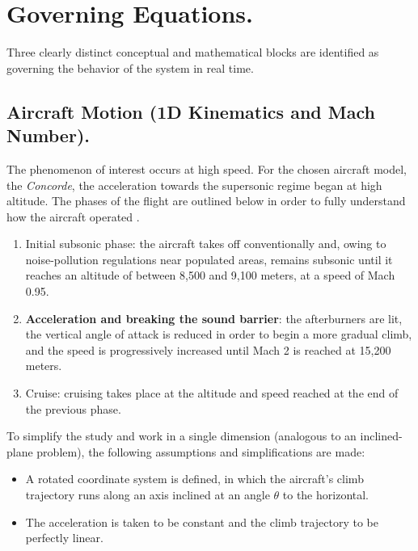 \documentclass[10.5pt]{article}
\begin{document}
	\newpage 
	\section{Governing Equations.}
	
	Three clearly distinct conceptual and mathematical blocks are identified as governing the behavior of the system in real time.
	
	\subsection{Aircraft Motion (1D Kinematics and Mach Number).}
	
	The phenomenon of interest occurs at high speed. For the chosen aircraft model, the \textit{Concorde}, the acceleration towards the supersonic regime began at high altitude. The phases of the flight are outlined below in order to fully understand how the aircraft operated \cite{912161}.
	
	\begin{enumerate}
		\item Initial subsonic phase: the aircraft takes off conventionally and, owing to noise-pollution regulations near populated areas, remains subsonic until it reaches an altitude of between 8,500 and 9,100 meters, at a speed of Mach 0.95. 
		
		\item \textbf{Acceleration and breaking the sound barrier}: the afterburners are lit, the vertical angle of attack is reduced in order to begin a more gradual climb, and the speed is progressively increased until Mach 2 is reached at 15,200 meters.
		
		\item Cruise: cruising takes place at the altitude and speed reached at the end of the previous phase. 
	\end{enumerate}
	
	To simplify the study and work in a single dimension (analogous to an inclined-plane problem), the following assumptions and simplifications are made:
	
	\begin{itemize}
		\item A rotated coordinate system is defined, in which the aircraft's climb trajectory runs along an axis inclined at an angle $\theta$ to the horizontal.
		
		\item The acceleration is taken to be constant and the climb trajectory to be perfectly linear.
	\end{itemize}
	
\end{document}
